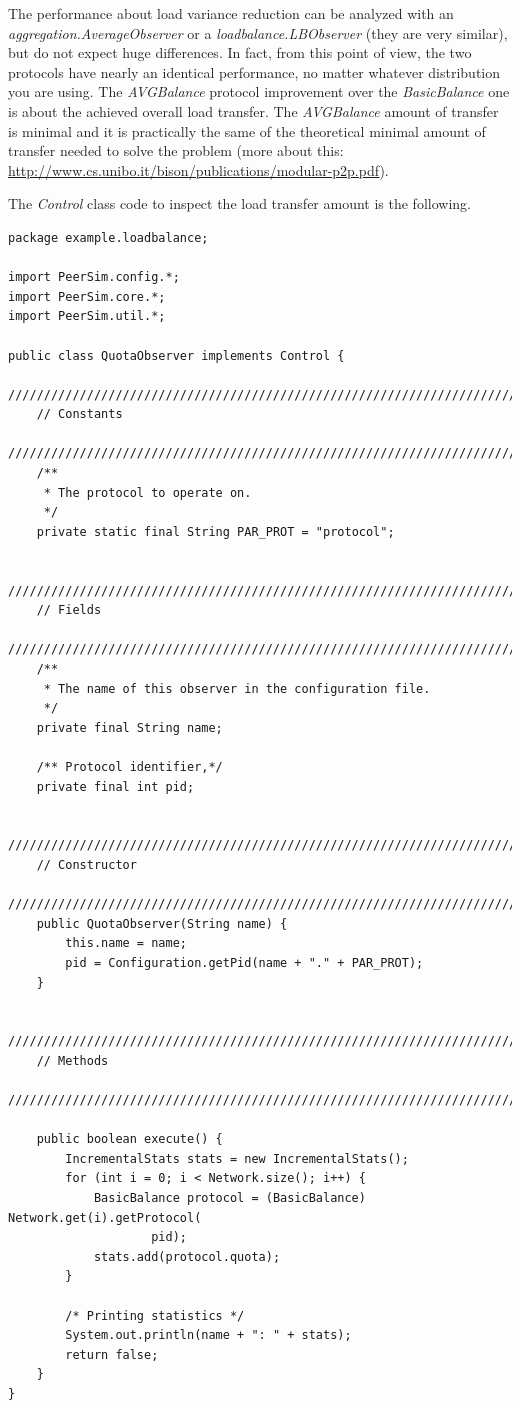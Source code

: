 \documentclass[a4paper,11pt]{article}
\begin{document}
The performance about load variance reduction can be analyzed with
an \emph{aggregation.AverageObserver} or a \emph{loadbalance.LBObserver}
(they are very similar), but do not expect huge differences. In fact,
from this point of view, the two protocols have nearly an identical
performance, no matter whatever distribution you are using. The 
\emph{AVGBalance}
protocol improvement over the \emph{BasicBalance} one is about the
achieved overall load transfer. The \emph{AVGBalance} amount of transfer
is minimal and it is practically the same of the theoretical minimal
amount of transfer needed to solve the problem 
(more about this: \url{http://www.cs.unibo.it/bison/publications/modular-p2p.pdf}). 

The \emph{Control} class code to inspect the load transfer amount
is the following. 

\footnotesize
\begin{verbatim}
package example.loadbalance;

import PeerSim.config.*;
import PeerSim.core.*;
import PeerSim.util.*;

public class QuotaObserver implements Control {
    /////////////////////////////////////////////////////////////////////////
    // Constants
    /////////////////////////////////////////////////////////////////////////
    /**
     * The protocol to operate on.
     */
    private static final String PAR_PROT = "protocol";

    /////////////////////////////////////////////////////////////////////////
    // Fields
    /////////////////////////////////////////////////////////////////////////
    /**
     * The name of this observer in the configuration file.
     */
    private final String name;

    /** Protocol identifier,*/
    private final int pid;

    /////////////////////////////////////////////////////////////////////////
    // Constructor
    /////////////////////////////////////////////////////////////////////////
    public QuotaObserver(String name) {
        this.name = name;
        pid = Configuration.getPid(name + "." + PAR_PROT);
    }

    /////////////////////////////////////////////////////////////////////////
    // Methods
    /////////////////////////////////////////////////////////////////////////

    public boolean execute() {
        IncrementalStats stats = new IncrementalStats();
        for (int i = 0; i < Network.size(); i++) {
            BasicBalance protocol = (BasicBalance) Network.get(i).getProtocol(
                    pid);
            stats.add(protocol.quota);
        }

        /* Printing statistics */
        System.out.println(name + ": " + stats);
        return false;
    }
}
\end{verbatim}
\normalsize
\end{document}
